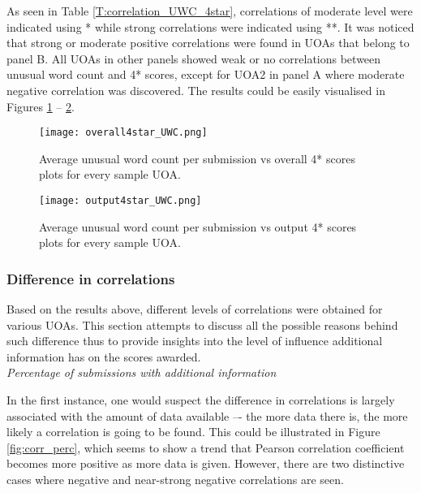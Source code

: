 \documentclass[a4paper, 11pt]{article}
\begin{document}
\noindent
As seen in Table \ref{T:correlation_UWC_4star}, correlations of moderate level were indicated using * while strong correlations were indicated using **. It was noticed that strong or moderate positive correlations were found in UOAs that belong to panel B. All UOAs in other panels showed weak or no correlations between unusual word count and 4* scores, except for UOA2 in panel A where moderate negative correlation was discovered. The results could be easily visualised in Figures \ref{fig:overallUWC} -- \ref{fig:outputUWC}.


\begin{figure}[H]
\begin{center}  \centering
  \texttt{[image: overall4star\_UWC.png]}
  \caption{Average unusual word count per submission vs overall 4* scores plots for every sample UOA.}
  \label{fig:overallUWC}
\end{center}
\end{figure}

\begin{figure}[H]
\begin{center}  \centering
\texttt{[image: output4star\_UWC.png]}
  \caption{Average unusual word count per submission vs output 4* scores plots for every sample UOA.}
  \label{fig:outputUWC}
\end{center}
\end{figure}


\subsubsection{Difference in correlations}

Based on the results above, different levels of correlations were obtained for various UOAs. This section attempts to discuss all the possible reasons behind such difference thus to provide insights into the level of influence additional information has on the scores awarded.\\

\noindent
\emph{Percentage of submissions with additional information}

\noindent
In the first instance, one would suspect the difference in correlations is largely associated with the amount of data available –- the more data there is, the more likely a correlation is going to be found. This could be illustrated in Figure \ref{fig:corr_perc}, which seems to show a trend that Pearson correlation coefficient becomes more positive as more data is given. However, there are two distinctive cases where negative and near-strong negative correlations are seen. \\
\end{document}
